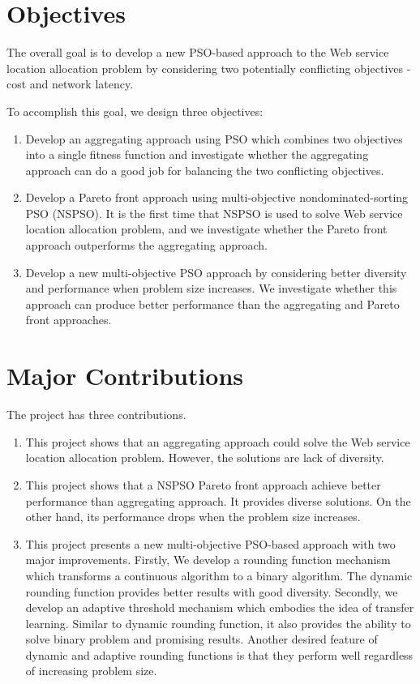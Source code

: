 \section{Objectives}
The overall goal is to develop a new PSO-based approach to the Web service location allocation problem by considering two potentially 
conflicting objectives - cost and network latency. 

To accomplish this goal, we design three objectives:
\begin{enumerate}
 \item Develop an aggregating approach using PSO which combines two objectives into a single fitness function and investigate whether the aggregating
	approach can do a good job for balancing the two conflicting objectives.
 \item Develop a Pareto front approach using multi-objective nondominated-sorting PSO (NSPSO). It is the first time that NSPSO is 
	used to solve Web service location allocation problem, and we investigate whether the Pareto front approach outperforms the aggregating approach.
 \item Develop a new multi-objective PSO approach by considering better diversity and performance when problem size increases. We investigate whether
	this approach can produce better performance than the aggregating and Pareto front approaches.
\end{enumerate}



\section{Major Contributions}
 The project has three contributions. 
 \begin{enumerate}
 \item This project shows that an aggregating approach could solve the Web service location allocation problem. However, the solutions are lack of diversity.
 \item This project shows that a NSPSO Pareto front approach achieve better performance than aggregating approach. It provides diverse solutions. On the 
	other hand, its performance drops when the problem size increases.
  \item This project presents a new multi-objective PSO-based approach with two major improvements. 
      Firstly, We develop a rounding function mechanism which transforms a continuous algorithm to a binary algorithm. 
      The dynamic rounding function provides better results with good diversity. 
      Secondly, we develop an adaptive threshold mechanism which embodies the idea of transfer learning. 
      Similar to dynamic rounding function, it also provides the ability to solve binary problem and promising results.
      Another desired feature of dynamic and adaptive rounding functions is that they perform well regardless of increasing problem size.
 \end{enumerate}

